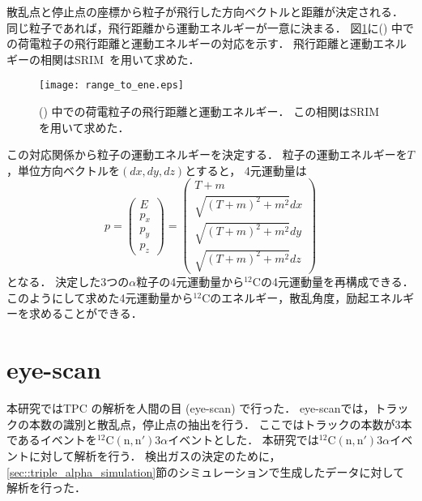 \documentclass[../master]{subfiles}
\begin{document}
散乱点と停止点の座標から粒子が飛行した方向ベクトルと距離が決定される．
同じ粒子であれば，飛行距離から運動エネルギーが一意に決まる．
図\ref{fig::range_to_ene_alpha}に\Methane () 中での荷電粒子の飛行距離と運動エネルギーの対応を示す．
飛行距離と運動エネルギーの相関はSRIM~\cite{srim}を用いて求めた．
\begin{figure}
  \centering
  \texttt{[image: range\_to\_ene.eps]}
  \caption[\Methane () 中での荷電粒子の飛行距離と運動エネルギー．]
          {\Methane () 中での荷電粒子の飛行距離と運動エネルギー．
            この相関はSRIM を用いて求めた．
          }
  \label{fig::range_to_ene_alpha}
\end{figure}
この対応関係から粒子の運動エネルギーを決定する．
粒子の運動エネルギーを$T$，単位方向ベクトルを$(dx, dy, dz)$とすると，
4元運動量は
\begin{equation}
  p =
  \begin{pmatrix}
    E \\ p_{x} \\ p_{y} \\ p_{z}
  \end{pmatrix}
  =
  \begin{pmatrix}
    T + m \\ \sqrt{(T+m)^2 + m^2} dx \\ \sqrt{(T+m)^2 + m^2} dy \\ \sqrt{(T+m)^2 + m^2} dz
  \end{pmatrix}
  \label{eq::momentum_vector}
\end{equation}
となる．
決定した3つの$\alpha$粒子の4元運動量から${}^{12}\mathrm{C}$の4元運動量を再構成できる．
このようにして求めた4元運動量から${}^{12}\mathrm{C}$のエネルギー，散乱角度，励起エネルギーを求めることができる．


\section{eye-scan}
本研究ではTPC の解析を人間の目 (eye-scan) で行った．
eye-scanでは，トラックの本数の識別と散乱点，停止点の抽出を行う．
ここではトラックの本数が3本であるイベントを${}^{12}\mathrm{C}(\mathrm{n},\mathrm{n}')3\alpha$イベントとした．
本研究では${}^{12}\mathrm{C}(\mathrm{n},\mathrm{n}')3\alpha$イベントに対して解析を行う．
検出ガスの決定のために，\ref{sec::triple_alpha_simulation}節のシミュレーションで生成したデータに対して解析を行った．
\end{document}
